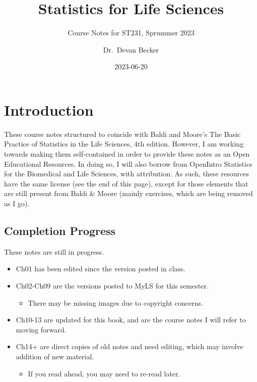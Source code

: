 \documentclass[
  letterpaper,
  DIV=11,
  numbers=noendperiod]{scrreprt}
\title{Statistics for Life Sciences}
\subtitle{Course Notes for ST231, Sprummer 2023}
\author{Dr.~Devan Becker}
\date{2023-06-20}
\providecommand{\tightlist}{%
  \setlength{\itemsep}{0pt}\setlength{\parskip}{0pt}}\usepackage{longtable,booktabs,array}
\renewcommand*\contentsname{Table of contents}
\newcommand\contentsname{Table of contents}
\begin{document}
\maketitle
\ifdefined\Shaded\renewenvironment{Shaded}{\begin{tcolorbox}[frame hidden, sharp corners, interior hidden, borderline west={3pt}{0pt}{shadecolor}, boxrule=0pt, enhanced, breakable]}{\end{tcolorbox}}\fi

\renewcommand*\contentsname{Table of contents}
{
\hypersetup{linkcolor=}
\setcounter{tocdepth}{2}
\tableofcontents
}

\hypertarget{introduction}{%
\chapter*{Introduction}\label{introduction}}


These course notes structured to coincide with Baldi and Moore's The
Basic Practice of Statistics in the Life Sciences, 4th edition. However,
I am working towards making them self-contained in order to provide
these notes as an Open Educational Resources. In doing so, I will also
borrow from OpenIntro Statistics for the Biomedical and Life Sciences,
with attribution. As such, these resources have the same license (see
the end of this page), except for those elements that are still present
from Baldi \& Moore (mainly exercises, which are being removed as I go).

\hypertarget{completion-progress}{%
\section*{Completion Progress}\label{completion-progress}}


These notes are still in progress.

\begin{itemize}
\tightlist
\item
  Ch01 has been edited since the version posted in class.
\item
  Ch02-Ch09 are the versions posted to MyLS for this semester.

  \begin{itemize}
  \tightlist
  \item
    There may be missing images due to copyright concerns.
  \end{itemize}
\item
  Ch10-13 are updated for this book, and are the course notes I will
  refer to moving forward.
\item
  Ch14+ are direct copies of old notes and need editing, which may
  involve addition of new material.

  \begin{itemize}
  \tightlist
  \item
    If you read ahead, you may need to re-read later.
  \end{itemize}
\end{itemize}
\end{document}
